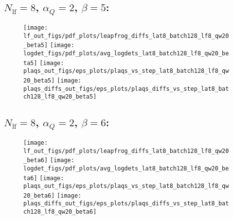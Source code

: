\clearpage
\subsection{\texorpdfstring{$N_{\mathrm{lf}} = 8$}{Nlf = 8}, \texorpdfstring{$\alpha_Q = 2$}{alphaq = 2},
\texorpdfstring{$\beta = 5$}{beta = 5}:}
\begin{figure}[htpb]
  \centering
  \texttt{[image: lf\_out\_figs/pdf\_plots/leapfrog\_diffs\_lat8\_batch128\_lf8\_qw20\_beta5]}
  \hfill
  \texttt{[image: logdet\_figs/pdf\_plots/avg\_logdets\_lat8\_batch128\_lf8\_qw20\_beta5]}
  \hfill
  \texttt{[image: plaqs\_out\_figs/eps\_plots/plaqs\_vs\_step\_lat8\_batch128\_lf8\_qw20\_beta5]}
  \hfill
  \texttt{[image: plaqs\_diffs\_out\_figs/eps\_plots/plaqs\_diffs\_vs\_step\_lat8\_batch128\_lf8\_qw20\_beta5]}
\end{figure}

\clearpage
\subsection{\texorpdfstring{$N_{\mathrm{lf}} = 8$}{Nlf = 8}, \texorpdfstring{$\alpha_Q = 2$}{alphaq = 2},
\texorpdfstring{$\beta = 6$}{beta = 6}:}
%
\begin{figure}[htpb]
  \centering
  \texttt{[image: lf\_out\_figs/pdf\_plots/leapfrog\_diffs\_lat8\_batch128\_lf8\_qw20\_beta6]}
  \hfill
  \texttt{[image: logdet\_figs/pdf\_plots/avg\_logdets\_lat8\_batch128\_lf8\_qw20\_beta6]}
  \hfill
  \texttt{[image: plaqs\_out\_figs/eps\_plots/plaqs\_vs\_step\_lat8\_batch128\_lf8\_qw20\_beta6]}
  \hfill
  \texttt{[image: plaqs\_diffs\_out\_figs/eps\_plots/plaqs\_diffs\_vs\_step\_lat8\_batch128\_lf8\_qw20\_beta6]}
\end{figure}
